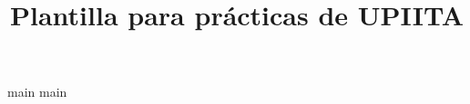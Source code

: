 


\title{Plantilla para prácticas de UPIITA}
\usepackage{preambulo-plantilla}







\tableofcontents
\newpage


\ifdefined\docRequerimientos
  {main}
\else
  \ifdefined\docEjemplo
    {main}
  \fi
\fi


